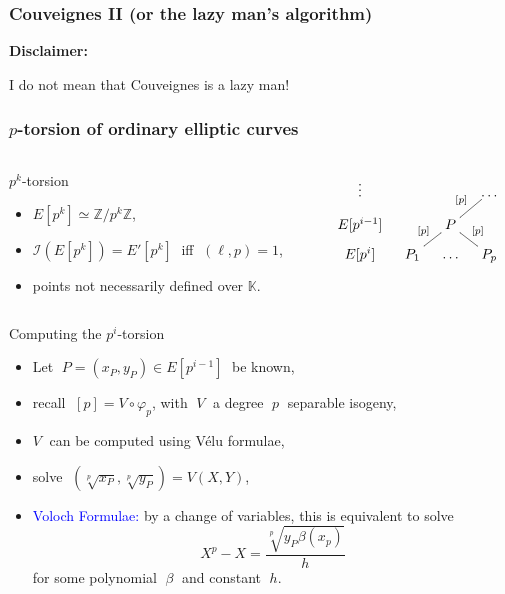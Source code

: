 \documentclass[10pt]{beamer}
\newcommand{\blue}[1]{\textcolor{blue}{#1}}  %
\newcommand{\Z}{\mathbb{Z}}  %
\newcommand{\K}{\mathbb{K}}  %
\newcommand{\frob}{\varphi}  %
\newcommand{\0}{\mathcal{O}}  %
\newcommand{\isog}[1]{\mathcal{#1}}  %
\newcommand{\I}{\isog{I}}  %
\begin{document}
\begin{frame}
  \frametitle{Couveignes II {\small(or the lazy man's algorithm)}}
  
  \Large
  \begin{center}
    \textbf{Disclaimer:}

    I do not mean that Couveignes is a lazy man!
  \end{center}
  
\end{frame}


\begin{frame}
  \frametitle{$p$-torsion of ordinary elliptic curves}
  
  \begin{columns}
    \begin{column}{0.55\textwidth}
      \begin{block}{$p^k$-torsion}
        \begin{itemize}
        \item $E[p^k] \simeq \Z/p^k\Z$,
        \item $\I(E[p^k]) = E'[p^k]\;$ iff $\;(\ell,p)=1$,
        \item \alert{points not necessarily defined over $\K$.}
        \end{itemize}
      \end{block}
    \end{column}
    \begin{column}{0.4\textwidth}
      \[\xymatrix@R=1ex@C=1em{
        \vdots     &&&\ldots\\
        E[p^{i-1}] && P \ar@{-}[ur]^{[p]} &\\
        E[p^i]    & P_1 \ar@{-}[ur]^{[p]} & \ldots & P_p \ar@{-}[ul]_{[p]}
      }\]
    \end{column}
  \end{columns}

  \begin{block}{Computing the $p^i$-torsion}
    \begin{itemize}
    \item Let $\;P=(x_P,y_P)\in E[p^{i-1}]\;$ be known,
    \item recall $\;[p] = V\circ\frob_p$, with $\;V\;$ a degree $\;p\;$
      separable isogeny,
    \item $V\;$ can be computed using Vélu formulae,
    \item solve $\;\left(\sqrt[p]{x_P}, \sqrt[p]{y_P}\right) = V(X,Y)$,
    \item \blue{Voloch Formulae:} by a change of variables,
      this is equivalent to solve
      \[X^p - X = \frac{\sqrt[p]{y_P\beta(x_p)}}{h}\]
      for some polynomial $\;\beta\;$ and constant $\;h$.
    \end{itemize}
  \end{block}
\end{frame}
\end{document}
